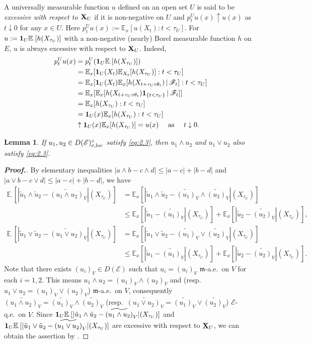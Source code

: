 \documentclass[12pt,a4paper]{article}
\newtheorem{lem}[thm]{Lemma}
\newcommand{\m}{\mathfrak{m} }
\newcommand{\loc}{{\rm loc}}
\newcommand{\1}{{\bf 1}}
\newcommand{\wt}{\widetilde}
\renewcommand{\wt}{\widetilde}
\begin{document}
A universally measurable function 
$u$ defined on an open set $U$ is said to be 
{\it excessive with respect to ${\bf X}_U$} if it is non-negative on $U$ and 
$p_t^Uu(x)\uparrow u(x)$ as $t\downarrow0$ for any $x\in U$. 
Here $p_t^Uu(x):=\mathbb{E}_x[u(X_t):t<\tau_U]$. For $u:=\1_U\mathbb{E}_{\cdot}[h(X_{\tau_U})]$ with a non-negative (nearly) Borel measurable function 
$h$ on $E$, $u$ is always excessive with respect to ${\bf X}_U$. Indeed, 
\begin{align*}
p_t^Uu(x)&=p_t^U(\1_U\mathbb{E}_{\cdot}[h(X_{\tau_U})])\\
&=\mathbb{E}_x[\1_U(X_t)\mathbb{E}_{X_t}[h(X_{\tau_U})]:t<\tau_U]\\
&=\mathbb{E}_x[\1_U(X_t)\mathbb{E}_x[h(X_{t+\tau_U\circ\theta_t})\,|\,\mathscr{F}_t]:t<\tau_U]\\
&=\mathbb{E}_x[\mathbb{E}_x[h(X_{t+\tau_U\circ\theta_t})\1_{\{t<\tau_U\}}\,|\,\mathscr{F}_t]]\\
&=\mathbb{E}_x[h(X_{\tau_U}):t<\tau_U]\\
&=\1_U(x)\mathbb{E}_x[h(X_{\tau_U}):t<\tau_U]\\
&\uparrow \1_U(x)\mathbb{E}_x[h(X_{\tau_U})]=u(x)\quad\text{ as }\quad t\downarrow0.
\end{align*} 
\begin{lem}\label{lem:lattice1}
If $u_1,u_2\in  D(\mathscr{E})^{\diamond}_{e,\loc}$ satisfy \eqref{eq:2.3}, then $u_1\land u_2$ and $u_1\lor u_2$ also satisfy \eqref{eq:2.3}. 
\end{lem}
\begin{proof}[{\bf Proof.}]
By elementary inequalities $|a\land b-c\land d|\leq |a-c|+|b-d|$ and $|a\lor b-c\lor d|\leq |a-c|+|b-d|$, we have 
\begin{align*}
\mathbb{E}_{\cdot}[|\tilde{u}_1\land \tilde{u}_2-\widetilde{(u_1\land u_2)}_V|(X_{\tau_U})]&=
\mathbb{E}_x[|\tilde{u}_1\land \tilde{u}_2-\widetilde{(u_1)}_V\land \widetilde{(u_2)}_V|(X_{\tau_U})]\\&\leq\mathbb{E}_x[|\tilde{u}_1-\widetilde{(u_1)}_V|(X_{\tau_U})]+\mathbb{E}_x[|\tilde{u}_2-\widetilde{(u_2)}_V|(X_{\tau_U})],\\
\mathbb{E}_{\cdot}[|\tilde{u}_1\lor \tilde{u}_2-\widetilde{(u_1\lor u_2)}_V|(X_{\tau_U})]&=
\mathbb{E}_x[|\tilde{u}_1\lor \tilde{u}_2-\widetilde{(u_1)}_V\lor \widetilde{(u_2)}_V|(X_{\tau_U})]\\&\leq\mathbb{E}_x[|\tilde{u}_1-\widetilde{(u_1)}_V|(X_{\tau_U})]+\mathbb{E}_x[|\tilde{u}_2-\widetilde{(u_2)}_V|(X_{\tau_U})].
\end{align*}
Note that there exists $(u_i)_V\in D(\mathscr{E})$ such that 
$u_i=(u_i)_V$ ${\m}$-a.e.~on $V$ for each $i=1,2$. This means 
$u_1\land u_2=(u_1)_V\land (u_2)_V$ and 
(resp.~$u_1\lor u_2=(u_1)_V\lor (u_2)_V$)   
${\m}$-a.e.~on $V$, consequently 
$\wt{(u_1\land u_2)_V}=\wt{(u_1)_V}\land\wt{(u_2)_V}$ (resp.~$\wt{(u_1\lor u_2)_V}=\wt{(u_1)_V}\lor\wt{(u_2)_V}$) $\mathscr{E}$-q.e.~on $V$. 
Since $\1_U\mathbb{E}_{\cdot}[|\tilde{u}_1\land \tilde{u}_2-\widetilde{(u_1\land u_2)}_V|(X_{\tau_U})]$ and $\1_U\mathbb{E}_{\cdot}[|\tilde{u}_1\lor \tilde{u}_2-\widetilde{(u_1\lor u_2)}_V|(X_{\tau_U})]$ are 
excessive with respect to ${\bf X}_U$, we can obtain the assertion 
by \cite[Lemma~3.3]{CK}.
\end{proof}
\end{document}
